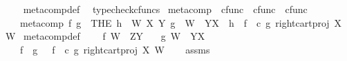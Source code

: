 \begin{isabellebody}
%
\isadelimproof
\ \ %
\endisadelimproof
%
\isatagproof
{}\isamarkupfalse%
\ meta{\isacharunderscore}{\kern0pt}comp{\isacharunderscore}{\kern0pt}def\ \isamarkupfalse%
\ typecheck{\isacharunderscore}{\kern0pt}cfuncs%
\endisatagproof
{\isafoldproof}%
%
\isadelimproof
\isanewline
%
\endisadelimproof
\isanewline
{}\isamarkupfalse%
\ meta{\isacharunderscore}{\kern0pt}comp{}\ {\isacharcolon}{\kern0pt}{\isacharcolon}{\kern0pt}\ {\isachardoublequoteopen}cfunc\ {\isasymRightarrow}\ cfunc\ {\isasymRightarrow}\ cfunc{\isachardoublequoteclose}\ {\isacharparenleft}{\kern0pt}\ {\isachardoublequoteopen}{\isasymbox}{\isachardoublequoteclose}\ {}{}{\isacharparenright}{\kern0pt}\isanewline
\ \ \ {\isachardoublequoteopen}meta{\isacharunderscore}{\kern0pt}comp{}\ f\ g\ {\isacharequal}{\kern0pt}\ {\isacharparenleft}{\kern0pt}THE\ h{\isachardot}{\kern0pt}\ {\isasymexists}\ W\ X\ Y{\isachardot}{\kern0pt}\ g\ {\isacharcolon}{\kern0pt}\ W\ {\isasymrightarrow}\ Y\isactrlbsup X\isactrlesup \ {\isasymand}\ h\ {\isacharequal}{\kern0pt}\ {\isacharparenleft}{\kern0pt}f\isactrlsup {\isasymflat}\ \ {\isasymcirc}\isactrlsub c\ {\isasymlangle}g\isactrlsup {\isasymflat}{\isacharcomma}{\kern0pt}\ right{\isacharunderscore}{\kern0pt}cart{\isacharunderscore}{\kern0pt}proj\ X\ W{\isasymrangle}{\isacharparenright}{\kern0pt}\isactrlsup {\isasymsharp}{\isacharparenright}{\kern0pt}{\isachardoublequoteclose}\isanewline
\isanewline
{}\isamarkupfalse%
\ meta{\isacharunderscore}{\kern0pt}comp{}{\isacharunderscore}{\kern0pt}def{}{\isacharcolon}{\kern0pt}\ \isanewline
\ \ \ {\isachardoublequoteopen}f{\isacharcolon}{\kern0pt}\ W\ {\isasymrightarrow}\ Z\isactrlbsup Y\isactrlesup {\isachardoublequoteclose}\isanewline
\ \ \ {\isachardoublequoteopen}g{\isacharcolon}{\kern0pt}\ W\ {\isasymrightarrow}\ Y\isactrlbsup X\isactrlesup {\isachardoublequoteclose}\isanewline
\ \ \ {\isachardoublequoteopen}f\ {\isasymbox}\ g\ \ {\isacharequal}{\kern0pt}\ {\isacharparenleft}{\kern0pt}f\isactrlsup {\isasymflat}\ \ {\isasymcirc}\isactrlsub c\ {\isasymlangle}g\isactrlsup {\isasymflat}{\isacharcomma}{\kern0pt}\ right{\isacharunderscore}{\kern0pt}cart{\isacharunderscore}{\kern0pt}proj\ X\ W{\isasymrangle}{\isacharparenright}{\kern0pt}\isactrlsup {\isasymsharp}{\isachardoublequoteclose}\isanewline
%
\isadelimproof
\ \ %
\endisadelimproof
%
\isatagproof
{}\isamarkupfalse%
\ assms\ \isamarkupfalse%

\end{isabellebody}
